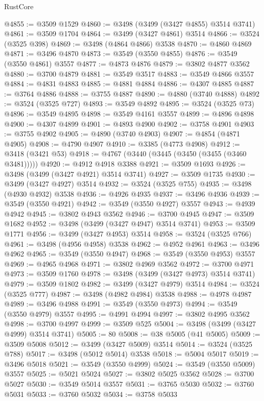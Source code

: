 \begin{lexlean}{RustCore}
\begin{coremodule}
@4855 := @3509 @1529
@4860 := @3498 (@3499 (@3427 @4855) @3514 @3741)
@4861 := @3509 @1704
@4864 := @3499 (@3427 @4861) @3514
@4866 := @3524 (@3525 @398)
@4869 := @3498 (@4864 @4866) @3538
@4870 := @4860 @4869
@4871 := @3496 @4870
@4873 := @3549 (@3550 @4855)
@4876 := @3549 (@3550 @4861) @3557
@4877 := @4873 @4876
@4879 := @3802 @4877 @3562
@4880 := @3700 @4879
@4881 := @3549 @3517
@4883 := @3549 @4866 @3557
@4884 := @4831 @4883
@4885 := @4881 @4884
@4886 := @4307 @4885
@4887 := @3764 @4886
@4888 := @3755 @4887
@4890 := @4880 (@3740 @4888)
@4892 := @3524 (@3525 @727)
@4893 := @3549 @4892
@4895 := @3524 (@3525 @73)
@4896 := @3549 @4895
@4898 := @3549 @4161 @3557
@4899 := @4896 @4898
@4900 := @4307 @4899
@4901 := @4893 @4900
@4902 := @3758 @4901
@4903 := @3755 @4902
@4905 := @4890 (@3740 @4903)
@4907 := @4854 (@4871 @4905)
@4908 := @4790 @4907
@4910 := @3385 (@4773 @4908)
@4912 := @3418 (@3421 @53)
@4918 := @4767 (@3440 (@3445 (@3450 (@3455 (@3460 @3481)))))
@4920 := @4912 @4918 @3388
@4921 := @3509 @1693
@4926 := @3498 (@3499 (@3427 @4921) @3514 @3741)
@4927 := @3509 @1735
@4930 := @3499 (@3427 @4927) @3514
@4932 := @3524 (@3525 @755)
@4935 := @3498 (@4930 @4932) @3538
@4936 := @4926 @4935
@4937 := @3496 @4936
@4939 := @3549 (@3550 @4921)
@4942 := @3549 (@3550 @4927) @3557
@4943 := @4939 @4942
@4945 := @3802 @4943 @3562
@4946 := @3700 @4945
@4947 := @3509 @1682
@4952 := @3498 (@3499 (@3427 @4947) @3514 @3741)
@4953 := @3509 @1771
@4956 := @3499 (@3427 @4953) @3514
@4958 := @3524 (@3525 @766)
@4961 := @3498 (@4956 @4958) @3538
@4962 := @4952 @4961
@4963 := @3496 @4962
@4965 := @3549 (@3550 @4947)
@4968 := @3549 (@3550 @4953) @3557
@4969 := @4965 @4968
@4971 := @3802 @4969 @3562
@4972 := @3700 @4971
@4973 := @3509 @1760
@4978 := @3498 (@3499 (@3427 @4973) @3514 @3741)
@4979 := @3509 @1802
@4982 := @3499 (@3427 @4979) @3514
@4984 := @3524 (@3525 @777)
@4987 := @3498 (@4982 @4984) @3538
@4988 := @4978 @4987
@4989 := @3496 @4988
@4991 := @3549 (@3550 @4973)
@4994 := @3549 (@3550 @4979) @3557
@4995 := @4991 @4994
@4997 := @3802 @4995 @3562
@4998 := @3700 @4997
@4999 := @3509 @525
@5004 := @3498 (@3499 (@3427 @4999) @3514 @3741)
@5005 := 80
@5008 := @38 @5005 (@41 @5005)
@5009 := @3509 @5008
@5012 := @3499 (@3427 @5009) @3514
@5014 := @3524 (@3525 @788)
@5017 := @3498 (@5012 @5014) @3538
@5018 := @5004 @5017
@5019 := @3496 @5018
@5021 := @3549 (@3550 @4999)
@5024 := @3549 (@3550 @5009) @3557
@5025 := @5021 @5024
@5027 := @3802 @5025 @3562
@5028 := @3700 @5027
@5030 := @3549 @5014 @3557
@5031 := @3765 @5030
@5032 := @3760 @5031
@5033 := @3760 @5032
@5034 := @3758 @5033

\end{coremodule}
\end{lexlean}
